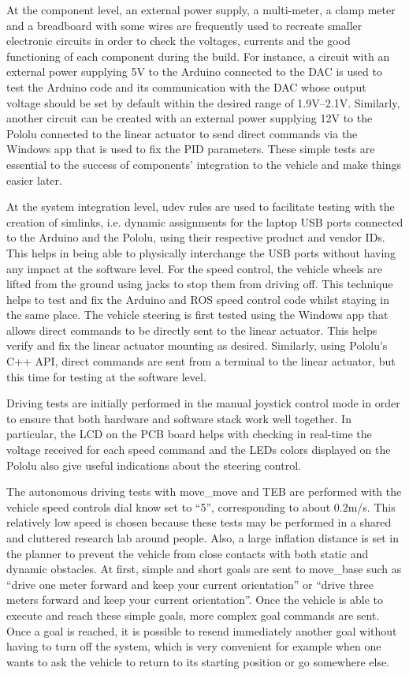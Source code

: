 \documentclass[a4paper]{article}
\begin{document}
	At the component level, an external power supply, a multi-meter, a clamp meter and a breadboard with some wires are frequently used to recreate smaller electronic circuits in order to check the voltages, currents and the good functioning of each component during the build. For instance, a circuit with an external power supplying 5V to the Arduino connected to the DAC is used to test the Arduino code and its communication with the DAC whose output voltage should be set by default within the desired range of 1.9V--2.1V. Similarly, another circuit can be created with an external power supplying 12V to the Pololu connected to the linear actuator to send direct commands via the Windows app that is used to fix the PID parameters. These simple tests are essential to the success of components' integration to the vehicle and make things easier later. 
	
	At the system integration level, udev rules are used to facilitate testing with the creation of simlinks, i.e. dynamic assignments for the laptop USB ports connected to the Arduino and the Pololu, using their respective product and vendor IDs. This helps in being able to physically interchange the USB ports without having any impact at the software level. For the speed control, the vehicle wheels are lifted from the ground using jacks to stop them from driving off. This technique helps to test and fix the Arduino and ROS speed control code whilst staying in the same place. The vehicle steering is first tested using the Windows app that allows direct commands to be directly sent to the linear actuator. This helps verify and fix the linear actuator mounting as desired. Similarly, using Pololu's C++ API, direct commands are sent from a terminal to the linear actuator, but this time for testing at the software level. 
	
	Driving tests are initially performed in the manual joystick control mode in order to ensure that both hardware and software stack work well together. In particular, the LCD on the PCB board helps with checking in real-time the voltage received for each speed command and the LEDs colors displayed on the Pololu also give useful indications about the steering control. 
	
	The autonomous driving tests with move\_move and TEB are performed with the vehicle speed controls dial know set to ``5'', corresponding to about $0.2$m/s. This relatively low speed is chosen because these tests may be performed in a shared and cluttered research lab around people. Also, a large inflation distance is set in the planner to prevent the vehicle from close contacts with both static and dynamic obstacles. At first, simple and short goals are sent to move\_base such as ``drive one meter forward and keep your current orientation'' or ``drive three meters forward and keep your current orientation''. Once the vehicle is able to execute and reach these simple goals, more complex goal commands are sent. Once a goal is reached, it is possible to resend immediately another goal without having to turn off the system, which is very convenient for example when one wants to ask the vehicle to return to its starting position or go somewhere else. 
	
\end{document}
